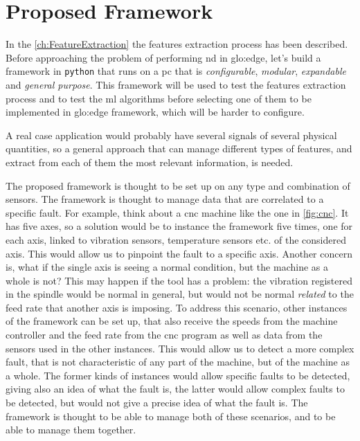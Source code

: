\chapter{Proposed Framework}
\label{ch:Framework}

In the \autoref{ch:FeatureExtraction} the features extraction process has been described. Before approaching the problem of performing \gls{nd} in \gls{glo:edge}, let's build a framework in \texttt{python} that runs on a \gls{pc} that is \emph{configurable}, \emph{modular}, \emph{expandable} and \emph{general purpose}. This framework will be used to test the features extraction process and to test the \gls{ml} algorithms before selecting one of them to be implemented in \gls{glo:edge} framework, which will be harder to configure.

A real case application would probably have several signals of several physical quantities, so a general approach that can manage different types of features, and extract from each of them the most relevant information, is needed.

The proposed framework is thought to be set up on any type and combination of sensors. The framework is thought to manage data that are correlated to a specific fault. For example, think about a \gls{cnc} machine like the one in \autoref{fig:cnc}. It has five axes, so a solution would be to instance the framework five times, one for each axis, linked to vibration sensors, temperature sensors etc. of the considered axis. This would allow us to pinpoint the fault to a specific axis. Another concern is, what if the single axis is seeing a normal condition, but the machine as a whole is not? This may happen if the tool has a problem: the vibration registered in the spindle would be normal in general, but would not be normal \emph{related} to the feed rate that another axis is imposing. To address this scenario, other instances of the framework can be set up, that also receive the speeds from the machine controller and the feed rate from the \gls{cnc} program as well as data from the sensors used in the other instances. This would allow us to detect a more complex fault, that is not characteristic of any part of the machine, but of the machine as a whole. The former kinds of instances would allow specific faults to be detected, giving also an idea of what the fault is, the latter would allow complex faults to be detected, but would not give a precise idea of what the fault is. The framework is thought to be able to manage both of these scenarios, and to be able to manage them together.

